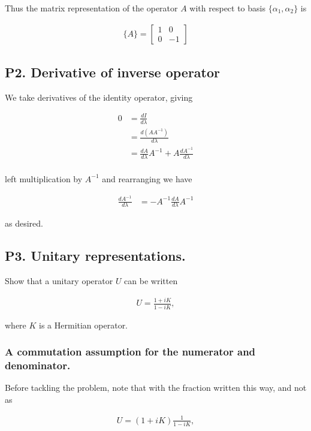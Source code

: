 Thus the matrix representation of the operator $A$ with respect to basis $\{\alpha_1, \alpha_2\}$ is

\begin{align*}
\{A\} =
\begin{bmatrix}
1 & 0 \\
0 & -1
\end{bmatrix} 
\end{align*}

\subsection{P2. Derivative of inverse operator}

We take derivatives of the identity operator, giving

\begin{align*}
0 
&= \frac{dI}{d\lambda} \\
&= \frac{d (A A^{-1})}{d\lambda} \\
&= \frac{d A }{d\lambda} A^{-1} + A \frac{d A^{-1}}{d\lambda} \\
\end{align*}

left multiplication by $A^{-1}$ and rearranging we have

\begin{align*}
\frac{d A^{-1}}{d\lambda} 
&= -A^{-1} \frac{d A }{d\lambda} A^{-1} 
\end{align*}

as desired.

\subsection{P3. Unitary representations.}

Show that a unitary operator $U$ can be written

\begin{align*}
U = \frac{1 + iK}{1-iK},
\end{align*}

where $K$ is a Hermitian operator.

\subsubsection{A commutation assumption for the numerator and denominator.}

Before tackling the problem, note that with the fraction written this way, and not as

\begin{align}\label{eqn:desaiDiracNotes:2}
U = (1 + iK)\frac{1}{1-iK},
\end{align}

